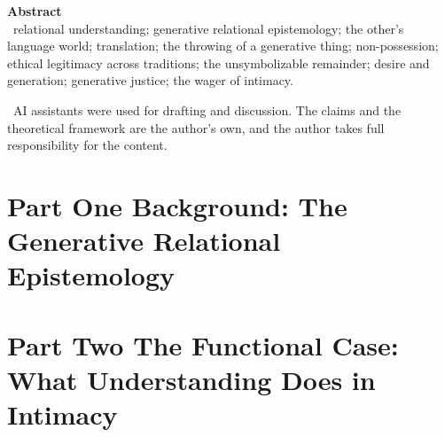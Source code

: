 \documentclass[11pt,a4paper]{article}
\begin{document}
\thispagestyle{empty}
\noindent\textbf{\large\color{rosedeep} Abstract}\\[0.6em]


\vspace{1.2em}
\, \textcolor{inksoft}{relational understanding; generative relational epistemology; the other's language world; translation; the throwing of a generative thing; non-possession; ethical legitimacy across traditions; the unsymbolizable remainder; desire and generation; generative justice; the wager of intimacy.}

\vspace{1.0em}
\, \textcolor{inksoft}{AI assistants were used for drafting and discussion. The claims and the theoretical framework are the author's own, and the author takes full responsibility for the content.}
\newpage

\tableofcontents
\newpage

\part*{\textcolor{rosedeep}{Part One \quad Background: The Generative Relational Epistemology}}





\part*{\textcolor{rosedeep}{Part Two \quad The Functional Case: What Understanding Does in Intimacy}}






\end{document}
